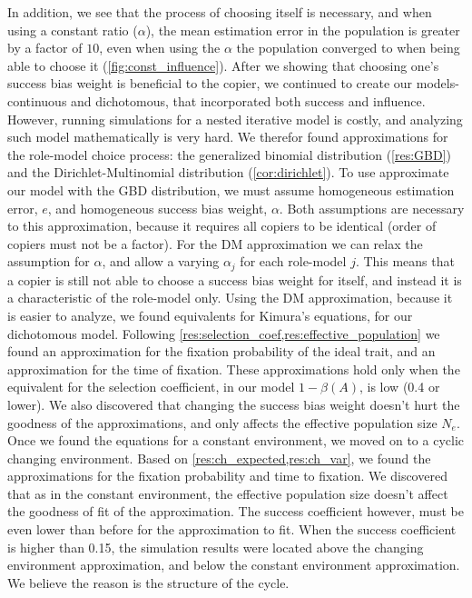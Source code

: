 \documentclass[12pt]{extarticle}
\begin{document}
In addition, we see that the process of choosing itself is necessary, and when using a constant ratio ($\alpha$), the mean estimation error in the population is greater by a factor of $10$, even when using the $\alpha$ the population converged to when being able to choose it (\cref{fig:const_influence}).
After we showing that choosing one's success bias weight is beneficial to the copier, we continued to create our models- continuous and dichotomous, that incorporated both success and influence. However, running simulations for a nested iterative model is costly, and analyzing such model mathematically is very hard. We therefor found approximations for the role-model choice process: the generalized binomial distribution (\cref{res:GBD}) and the Dirichlet-Multinomial distribution (\cref{cor:dirichlet}).
To use approximate our model with the GBD distribution, we must assume homogeneous estimation error, $e$, and homogeneous success bias weight, $\alpha$. Both assumptions are necessary to this approximation, because it requires all copiers to be identical (order of copiers must not be a factor).
For the DM approximation we can relax the assumption for $\alpha$, and allow a varying $\alpha_j$ for each role-model $j$. This means that a copier is still not able to choose a success bias weight for itself, and instead it is a characteristic of the role-model only.
Using the DM approximation, because it is easier to analyze, we found equivalents for Kimura's equations, for our dichotomous model.
Following \cref{res:selection_coef,res:effective_population} we found an approximation for the fixation probability of the ideal trait, and an approximation for the time of fixation. These approximations hold only when the equivalent for the selection coefficient, in our model $1-\beta(A)$, is low (0.4 or lower). We also discovered that changing the success bias weight doesn't hurt the goodness of the approximations, and only affects the effective population size $N_e$.
Once we found the equations for a constant environment, we moved on to a cyclic changing environment.
Based on \cref{res:ch_expected,res:ch_var}, we found the approximations for the fixation probability and time to fixation.
We discovered that as in the constant environment, the effective population size doesn't affect the goodness of fit of the approximation. The success coefficient however, must be even lower than before for the approximation to fit. When the success coefficient is higher than 0.15, the simulation results were located above the changing environment approximation, and below the constant environment approximation. We believe the reason is the structure of the cycle.
\end{document}
